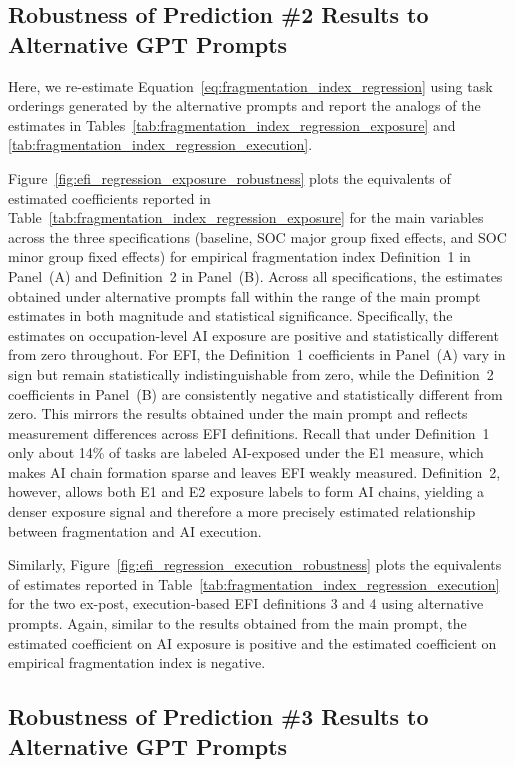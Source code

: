 \subsection{Robustness of Prediction \#2 Results to Alternative GPT Prompts}
\label{app:gptPrompts_robustness_pred2}

Here, we re-estimate Equation~\eqref{eq:fragmentation_index_regression} using task orderings generated by the alternative prompts and report the analogs of the estimates in Tables~\ref{tab:fragmentation_index_regression_exposure} and \ref{tab:fragmentation_index_regression_execution}.

Figure~\ref{fig:efi_regression_exposure_robustness} plots the equivalents of estimated coefficients reported in Table~\ref{tab:fragmentation_index_regression_exposure} for the main variables across the three specifications (baseline, SOC major group fixed effects, and SOC minor group fixed effects) for empirical fragmentation index Definition~1 in Panel~(A) and Definition~2 in Panel~(B).
Across all specifications, the estimates obtained under alternative prompts fall within the range of the main prompt estimates in both magnitude and statistical significance.
Specifically, the estimates on occupation-level AI exposure are positive and statistically different from zero throughout.
For EFI, the Definition~1 coefficients in Panel~(A) vary in sign but remain statistically indistinguishable from zero, while the Definition~2 coefficients in Panel~(B) are consistently negative and statistically different from zero.
This mirrors the results obtained under the main prompt and reflects measurement differences across EFI definitions.
Recall that under Definition~1 only about 14\% of tasks are labeled AI-exposed under the E1 measure, which makes AI chain formation sparse and leaves EFI weakly measured.
Definition~2, however, allows both E1 and E2 exposure labels to form AI chains, yielding a denser exposure signal and therefore a more precisely estimated relationship between fragmentation and AI execution.

Similarly, Figure~\ref{fig:efi_regression_execution_robustness} plots the equivalents of estimates reported in Table~\ref{tab:fragmentation_index_regression_execution} for the two ex-post, execution-based EFI definitions 3 and 4 using alternative prompts.
Again, similar to the results obtained from the main prompt, the estimated coefficient on AI exposure is positive and the estimated coefficient on empirical fragmentation index is negative.


\subsection{Robustness of Prediction \#3 Results to Alternative GPT Prompts}
\label{app:gptPrompts_robustness_pred3}


